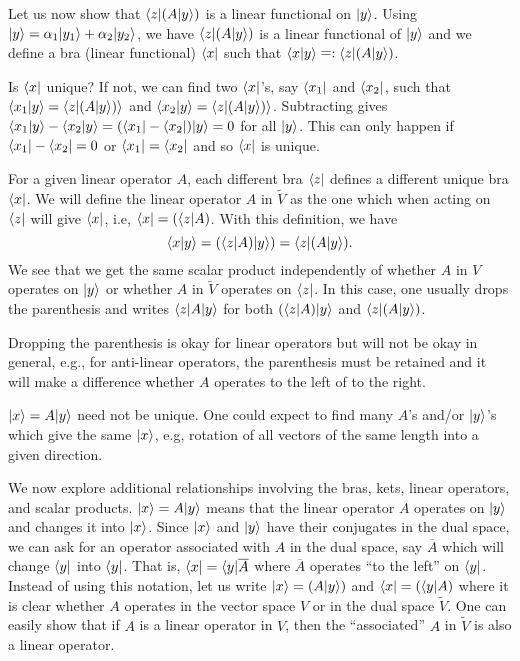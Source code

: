 Let us now show that $\langle z| (A|y\rangle )$ is a linear functional on $|y\rangle$. 
Using $|y\rangle = \alpha_1 |y_1\rangle + \alpha_2 |y_2\rangle$, 
we have $\langle z|(A|y\rangle)$ is a linear functional of $|y\rangle$ and we define
a bra (linear functional) $\langle x|$ such that $\langle x|y\rangle \mathrel{\mathop=}: \langle z|(A|y\rangle)$. 

Is $\langle x|$ unique? If not, we can find two $\langle x|$'s, say $\langle x_1|$ and $\langle x_2|$, such that 
$\langle x_1|y\rangle = \langle z|(A|y\rangle)\rangle$ and $\langle x_2|y\rangle = \langle z|(A|y\rangle)\rangle$.
Subtracting gives
$\langle x_1|y\rangle - \langle x_2|y\rangle = (\langle x_1| - \langle x_2|)|y\rangle = 0$
for all $|y\rangle$. This can only happen if $\langle x_1| - \langle x_2| = 0$ or $\langle x_1| = \langle x_2|$ and so $\langle x|$ is unique.

For a given linear operator $A$, each different bra $\langle z|$ defines a different unique bra $\langle x|$. 
We will define the linear operator $A$ in $\tilde V$ as the one which when acting on 
$\langle z|$ will give $\langle x|$, i.e, $\langle x| = (\langle z|A)$.
With this definition, we have $$\langle x|y\rangle = (\langle z|A)|y\rangle) = \langle z|(A|y\rangle).$$ 
We see that we get the same scalar product independently of whether $A$ in $V$ operates 
on $|y\rangle$ or whether $A$ in $\tilde V$ operates on $\langle z|$.
In this case, one usually drops the parenthesis and writes 
$\langle z| A| y \rangle$ for both 
$(\langle z|A)|y\rangle$ and $\langle z|(A|y\rangle)$.

Dropping the parenthesis is okay for linear operators but will not be okay in general, e.g., for anti-linear operators, the parenthesis must be retained and it will make a difference whether $A$ operates to the left of to the right.

$|x\rangle = A|y\rangle$ need not be unique. One could expect to find many $A$'s and/or $|y\rangle$'s which give the same $|x\rangle$, e.g, rotation of all vectors of the same length into a given direction.

We now explore additional relationships involving the bras, kets, linear operators, and scalar products. $|x\rangle = A|y\rangle$ means that the linear operator $A$ operates on $|y\rangle$ and changes it into $|x\rangle$. Since $|x\rangle$ and $|y\rangle$
have their conjugates in the dual space, we can ask for an operator associated with $A$ in the dual space, say $\overline{A}$ which will change $\langle y|$ into $\langle y|$. That is, $\langle x| = \langle y|\overline{A}$ where $\overline{A}$ operates
``to the left'' on $\langle y|$. Instead of using this notation, let us write $|x\rangle = (A|y\rangle)$ and $\langle x| = (\langle y|A)$ where it is clear whether $A$ operates in the vector space $V$ or in the dual space $\tilde V$. One can easily show that if
$A$ is a linear operator in $V$, then the ``associated'' $A$ in $\tilde V$ is also a linear operator. 

